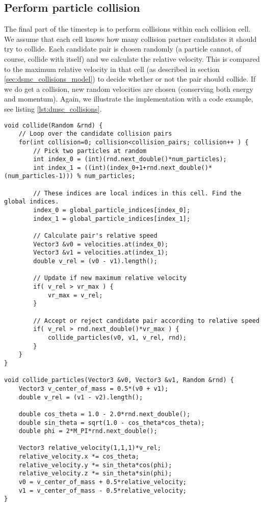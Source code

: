 \subsection{Perform particle collision}
The final part of the timestep is to perform collisions within each collision cell. We assume that each cell knows how many collision partner candidates it should try to collide. Each candidate pair is chosen randomly (a particle cannot, of course, collide with itself) and we calculate the relative velocity. This is compared to the maximum relative velocity in that cell (as described in section \ref{sec:dsmc_collisions_model}) to decide whether or not the pair should collide. If we do get a collision, new random velocities are chosen (conserving both energy and momentum). Again, we illustrate the implementation with a code example, see listing \ref{lst:dmsc_collisions}.
\begin{lstlisting}[caption=Example code showing how to perform collisions., label=lst:dmsc_collisions]
void collide(Random &rnd) {
	// Loop over the candidate collision pairs
    for(int collision=0; collision<collision_pairs; collision++ ) {
		// Pick two particles at random
        int index_0 = (int)(rnd.next_double()*num_particles);
        int index_1 = ((int)(index_0+1+rnd.next_double()*(num_particles-1))) % num_particles;

        // These indices are local indices in this cell. Find the global indices.
        index_0 = global_particle_indices[index_0];
        index_1 = global_particle_indices[index_1];

		// Calculate pair's relative speed
        Vector3 &v0 = velocities.at(index_0);
        Vector3 &v1 = velocities.at(index_1);
        double v_rel = (v0 - v1).length();

        // Update if new maximum relative velocity
        if( v_rel > vr_max ) { 
            vr_max = v_rel;
        }

		// Accept or reject candidate pair according to relative speed
        if( v_rel > rnd.next_double()*vr_max ) {
            collide_particles(v0, v1, v_rel, rnd);
		}
	}
}

void collide_particles(Vector3 &v0, Vector3 &v1, Random &rnd) {
    Vector3 v_center_of_mass = 0.5*(v0 + v1);
    double v_rel = (v1 - v2).length();
    
    double cos_theta = 1.0 - 2.0*rnd.next_double();
    double sin_theta = sqrt(1.0 - cos_theta*cos_theta);
    double phi = 2*M_PI*rnd.next_double();

    Vector3 relative_velocity(1,1,1)*v_rel;
    relative_velocity.x *= cos_theta;
    relative_velocity.y *= sin_theta*cos(phi);
    relative_velocity.z *= sin_theta*sin(phi);
    v0 = v_center_of_mass + 0.5*relative_velocity;
    v1 = v_center_of_mass - 0.5*relative_velocity;
}
\end{lstlisting}
